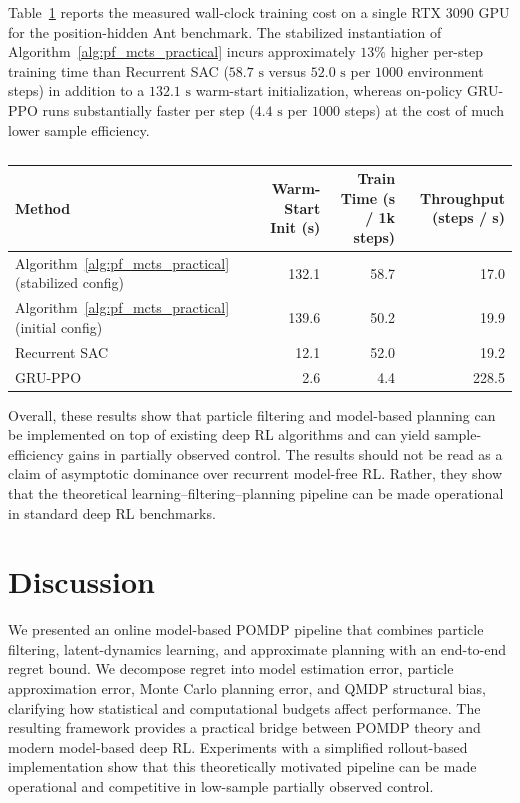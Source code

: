 \begin{aigenblock}
Table~\ref{tab:ch08_runtime} reports the measured wall-clock training cost on a single RTX 3090 GPU for the position-hidden Ant benchmark. The stabilized instantiation of Algorithm~\ref{alg:pf_mcts_practical} incurs approximately $13\%$ higher per-step training time than Recurrent SAC ($58.7\text{ s}$ versus $52.0\text{ s}$ per $1000$ environment steps) in addition to a $132.1\text{ s}$ warm-start initialization, whereas on-policy GRU-PPO runs substantially faster per step ($4.4\text{ s}$ per $1000$ steps) at the cost of much lower sample efficiency.

\begin{table}[t]
\centering
\caption[Wall-clock training runtime on partial-observation MuJoCo Ant]{}
\label{tab:ch08_runtime}
\small
\begin{tabular}{lrrr}
\toprule
Method & Warm-Start Init (s) & Train Time (s / 1k steps) & Throughput (steps / s) \\
\midrule
Algorithm~\ref{alg:pf_mcts_practical} (stabilized config) & 132.1 & 58.7 & 17.0 \\
Algorithm~\ref{alg:pf_mcts_practical} (initial config) & 139.6 & 50.2 & 19.9 \\
Recurrent SAC & 12.1 & 52.0 & 19.2 \\
GRU-PPO & 2.6 & 4.4 & 228.5 \\
\bottomrule
\end{tabular}
\end{table}
\end{aigenblock}

Overall, these results show that particle filtering and model-based planning can be implemented on top of existing deep RL algorithms and can yield sample-efficiency gains in partially observed control.  The results should not be read as a claim
of asymptotic dominance over recurrent model-free RL.  Rather, they show that the
theoretical learning--filtering--planning pipeline can be made operational in
standard deep RL benchmarks.



\section{Discussion}
\label{sec:conclusion}

We presented an online model-based POMDP pipeline that combines particle filtering, latent-dynamics learning, and approximate planning with an end-to-end regret bound. We decompose regret into model estimation error, particle approximation error, Monte Carlo planning error, and QMDP structural bias, clarifying how statistical and computational budgets affect performance. The resulting framework provides a practical bridge between POMDP theory and modern model-based deep RL. Experiments with a simplified rollout-based implementation show that this theoretically motivated pipeline can be made operational and competitive in low-sample partially observed control.

